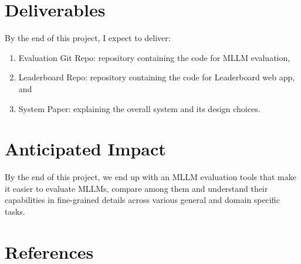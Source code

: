 \documentclass[
	letterpaper, %
]{jdf}
\begin{document}
\section{Deliverables}
By the end of this project, I expect to deliver:
\begin{enumerate}
         \item Evaluation Git Repo: repository containing the code for MLLM evaluation,
         \item Leaderboard Repo: repository containing the code for Leaderboard web app, and
         \item System Paper: explaining the overall system and its design choices.
              \end{enumerate}

\section{Anticipated Impact}\label{sect:impact}
By the end of this project, we end up with an MLLM evaluation tools that make it easier to evaluate MLLMs, compare among them and understand their capabilities in fine-grained details across various general and domain specific tasks.

\section{References}
\printbibliography[heading=none]
\end{document}

